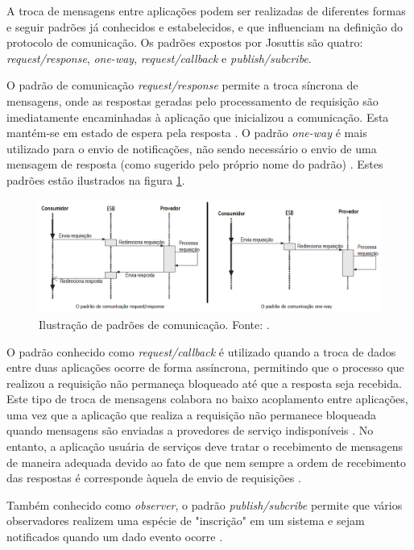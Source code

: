 A troca de mensagens entre aplicações podem ser realizadas de diferentes formas e seguir padrões já conhecidos e estabelecidos, e que influenciam na definição do protocolo de comunicação. Os padrões expostos por Josuttis \cite{josuttis_soa_2007} são quatro: \textit{request/response}, \textit{one-way}, \textit{request/callback} e \textit{publish/subcribe}.

O padrão de comunicação \textit{request/response} permite a troca síncrona de mensagens, onde as respostas geradas pelo processamento de requisição são imediatamente encaminhadas à aplicação que inicializou a comunicação. Esta mantém-se em estado de espera pela resposta \cite{josuttis_soa_2007}. O padrão \textit{one-way} é mais utilizado para o envio de notificações, não sendo necessário o envio de uma mensagem de resposta (como sugerido pelo próprio nome do padrão) \cite{josuttis_soa_2007}. Estes padrões estão ilustrados na figura \ref{padroes_comunicacao}.

\begin{figure}[htb]
\centering
\includegraphics[scale=0.5]{figuras/padroes_comunicacao.png}
\caption{Ilustração de padrões de comunicação. Fonte: \cite{josuttis_soa_2007}.}
\label{padroes_comunicacao}
\end{figure}

O padrão conhecido como \textit{request/callback} é utilizado quando a troca de dados entre duas aplicações ocorre de forma assíncrona, permitindo que o processo que realizou a requisição não permaneça bloqueado até que a resposta seja recebida. Este tipo de troca de mensagens colabora no baixo acoplamento entre aplicações, uma vez que a aplicação que realiza a requisição não permanece bloqueada quando mensagens são enviadas a provedores de serviço indisponíveis \cite{josuttis_soa_2007}. No entanto, a aplicação usuária de serviços deve tratar o recebimento de mensagens de maneira adequada devido ao fato de que nem sempre a ordem de recebimento das respostas é corresponde àquela de envio de requisições \cite{josuttis_soa_2007}.

Também conhecido como \textit{observer}, o padrão \textit{publish/subcribe} permite que vários observadores realizem uma espécie de "inscrição" em um sistema e sejam notificados quando um dado evento ocorre \cite{josuttis_soa_2007}.

